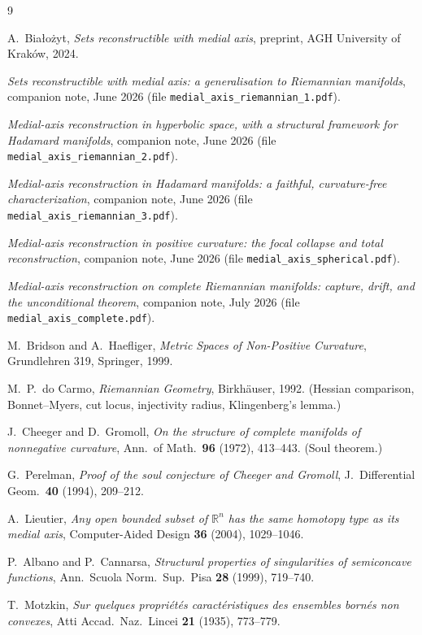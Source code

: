 \documentclass[11pt]{article}
\theoremstyle{remark}
\newcommand{\R}{\mathbb{R}}
\begin{document}
\begin{thebibliography}{9}

 A.~Bia\l{}o\.zyt, \emph{Sets reconstructible with medial
axis}, preprint, AGH University of Krak\'ow, 2024.

 \emph{Sets reconstructible with medial axis: a
generalisation to Riemannian manifolds}, companion note, June 2026
(file \texttt{medial\_axis\_riemannian\_1.pdf}).

 \emph{Medial-axis reconstruction in hyperbolic space, with a
structural framework for Hadamard manifolds}, companion note, June 2026
(file \texttt{medial\_axis\_riemannian\_2.pdf}).

 \emph{Medial-axis reconstruction in Hadamard manifolds: a
faithful, curvature-free characterization}, companion note, June 2026
(file \texttt{medial\_axis\_riemannian\_3.pdf}).

 \emph{Medial-axis reconstruction in positive curvature: the
focal collapse and total reconstruction}, companion note, June 2026
(file \texttt{medial\_axis\_spherical.pdf}).

 \emph{Medial-axis reconstruction on complete Riemannian
manifolds: capture, drift, and the unconditional theorem}, companion
note, July 2026 (file \texttt{medial\_axis\_complete.pdf}).

 M.~Bridson and A.~Haefliger, \emph{Metric Spaces of
Non-Positive Curvature}, Grundlehren 319, Springer, 1999.

 M.~P.~do Carmo, \emph{Riemannian Geometry},
Birkh\"auser, 1992. (Hessian comparison, Bonnet--Myers, cut locus,
injectivity radius, Klingenberg's lemma.)

 J.~Cheeger and D.~Gromoll, \emph{On the structure of complete
manifolds of nonnegative curvature}, Ann.\ of Math.\ \textbf{96} (1972),
413--443. (Soul theorem.)

 G.~Perelman, \emph{Proof of the soul conjecture of Cheeger
and Gromoll}, J.\ Differential Geom.\ \textbf{40} (1994), 209--212.

 A.~Lieutier, \emph{Any open bounded subset of $\R^{n}$ has
the same homotopy type as its medial axis}, Computer-Aided Design
\textbf{36} (2004), 1029--1046.

 P.~Albano and P.~Cannarsa, \emph{Structural properties of
singularities of semiconcave functions}, Ann.\ Scuola Norm.\ Sup.\ Pisa
\textbf{28} (1999), 719--740.

 T.~Motzkin, \emph{Sur quelques propri\'et\'es
caract\'eristiques des ensembles born\'es non convexes}, Atti Accad.\
Naz.\ Lincei \textbf{21} (1935), 773--779.

\end{thebibliography}
\end{document}

